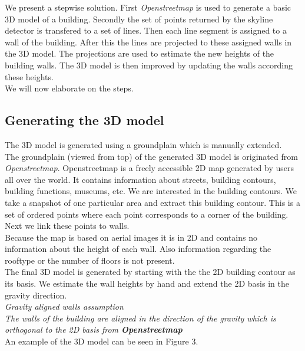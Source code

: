 \documentclass[10pt]{article}
\begin{document}
We present a stepwise solution. First \emph{Openstreetmap} is used to generate
a basic 3D model of a building. Secondly the set of points returned by the
skyline detector is transfered to a set of lines. Then each line segment is
assigned to a wall of the building. After this the lines are projected to these
assigned walls in the 3D model. 
The projections are used to estimate the new heights of the building walls.
The 3D model is then improved by updating the walls according these heights. \\
We will now elaborate on the steps.

\subsection{Generating the 3D model}
The 3D model is generated using a groundplain which is manually extended.\\
The groundplain (viewed from top) of the generated 3D model is originated from
\emph{Openstreetmap}.  Openstreetmap is a freely accessible 2D map generated by
users all over the world. It contains information about streets, building
contours, building functions, museums, etc.  We are interested in the building
contours.  We take a snapshot of one particular area and extract this building
contour.  This is a set of ordered points where each point corresponds to a
corner of the building.  Next we link these points to walls.\\ 
Because the map is based on aerial images it is in 2D and contains no
information about the height of each wall.  Also information regarding the
rooftype or the number of floors is not present.\\
The final 3D model is generated by starting with the the 2D building contour as
its basis. We estimate the wall heights by hand and extend the
2D basis in the gravity direction.\\
\emph{Gravity aligned walls assumption}\\
	\emph{The walls of the building are aligned in the direction of the gravity
	which is orthogonal to the 2D basis from \textbf{Openstreetmap}}\\

An example of the 3D model can be seen in Figure 3.\\
\end{document}
